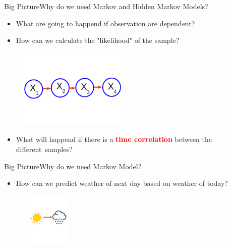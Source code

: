 \documentclass[10pt]{beamer}
\begin{document}
\begin{frame}{Big Picture}{Why do we need Markov and Hidden Markov Models?}
  \begin{itemize}
    \item What are going to happend if observation are dependent?
    \item How can we calculate the "likelihood" of the sample?
  \end{itemize}
  \begin{figure}[h]
    \centering
    \includegraphics[width=2in,height=1.5in]{figures/not_idd.png}
  \end{figure}
  \begin{itemize}
    \item What will happend if there is a 
          \textcolor{red}{\textbf{time correlation}} between the different\
          samples?\cite{Anders}
  \end{itemize}

\end{frame}

\begin{frame}{Big Picture}{Why do we need Markov Model?}
  \begin{itemize}
    \item How can we predict weather of next day based on weather of today?
  \end{itemize}
  \begin{figure}[h]
    \centering
    \includegraphics[width=1in,height=1in]{figures/sunny_to_rainny.png}
  \end{figure}
\end{frame}
\end{document}
